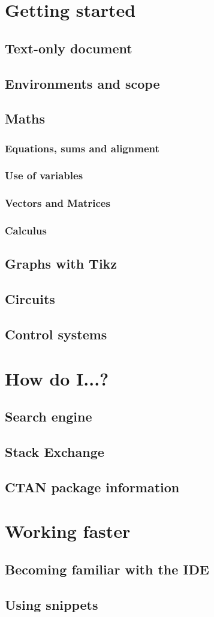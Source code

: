 \chapter{Getting started}
    \section{Text-only document}
    \section{Environments and scope}
    \section{Maths}
        \subsection{Equations, sums and alignment}
        \subsection{Use of variables} %
        \subsection{Vectors and Matrices}
        \subsection{Calculus}
    \section{Graphs with Tikz}
    \section{Circuits}
    \section{Control systems}

\chapter{How do I...?}
    \section{Search engine}
    \section{Stack Exchange}
    \section{CTAN package information}

\chapter{Working faster}
    \section{Becoming familiar with the IDE}
    \section{Using snippets}